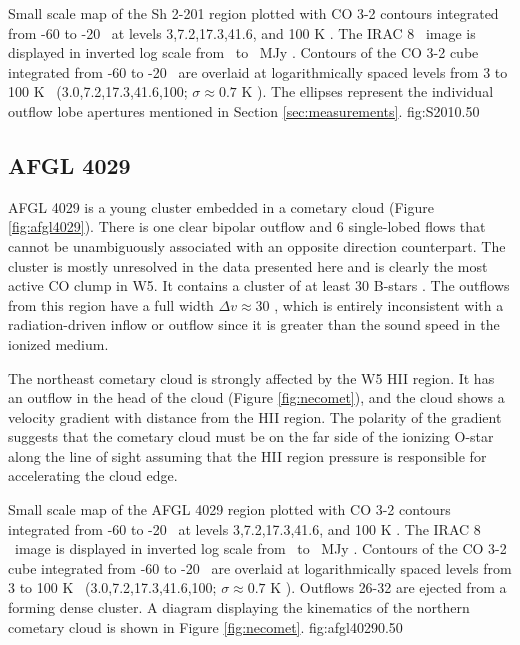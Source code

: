 {Small scale map of the Sh 2-201 region plotted with CO 3-2 contours integrated
from -60 to -20 \kms\ at levels 3,7.2,17.3,41.6, and 100 K \kms.  
The IRAC 8 \um\ image is displayed in inverted log scale from \lowirac\
to \highirac\ MJy \persr. Contours of the CO 3-2 cube integrated from
-60 to -20 \kms\ are overlaid at logarithmically spaced levels from 3 to 100 K
\kms\ (3.0,7.2,17.3,41.6,100; $\sigma\approx0.7$ K \kms).  The
ellipses represent the individual outflow lobe apertures mentioned in Section
\ref{sec:measurements}.
}{fig:S201}{0.5}{0}

\subsection{AFGL 4029}
\label{sec:afgl4029}
AFGL 4029 is a young cluster embedded in a cometary cloud (Figure
\ref{fig:afgl4029}).  There is one clear bipolar outflow and 6 single-lobed
flows that cannot be unambiguously associated with an opposite direction
counterpart.  The cluster is mostly unresolved in the data presented here and
is clearly the most active CO clump in W5.  It contains a cluster of at least 30 B-stars
\citep{Deharveng1997}.  The outflows from this region have a full width $\Delta
v \approx 30$ \kms, which is entirely inconsistent with a radiation-driven
inflow or outflow since it is greater than the sound speed in the ionized
medium.

The northeast cometary cloud is strongly affected by
the W5 HII region.  It has an outflow in the head of the cloud (Figure
\ref{fig:necomet}), and the cloud shows a velocity gradient with distance from
the HII region.  The polarity of the gradient suggests that the cometary cloud
must be on the far side of the ionizing O-star along the line of sight assuming
that the HII region pressure is responsible for accelerating the cloud edge.

{Small scale map of the AFGL 4029 region plotted with CO 3-2 contours integrated
from -60 to -20 \kms\ at levels 3,7.2,17.3,41.6, and 100 K \kms.  
The IRAC 8 \um\ image is displayed in inverted log scale from \lowirac\ to
\highirac\ MJy \persr. Contours of the CO 3-2 cube integrated from -60 to -20
\kms\ are overlaid at logarithmically spaced levels from 3 to 100 K \kms\
(3.0,7.2,17.3,41.6,100; $\sigma\approx0.7$ K \kms).  Outflows 26-32 are ejected
from a forming dense cluster.  A diagram displaying the kinematics of the
northern cometary cloud is shown in Figure \ref{fig:necomet}. }
{fig:afgl4029}{0.5}{0}


